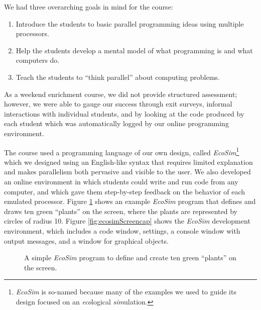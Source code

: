 \documentclass{sig-alternate}
\newcommand{\INDSTATE}[1][1]{\STATE\hspace{#1\algorithmicindent}}
\newcommand{\EcoSim}{\emph{EcoSim}}
\begin{document}
We had three overarching goals in mind for the course:
\begin{enumerate}
\item Introduce the students to basic parallel programming ideas using multiple processors.
\item Help the students develop a mental model of what programming is and what computers do.
\item Teach the students to ``think parallel'' about computing problems.
\end{enumerate}
As a weekend enrichment course, we did not provide structured assessment;
however, we were able to gauge our success through exit surveys, 
informal interactions with individual students, and by looking at the code produced by each student
which was automatically logged by our online programming environment.

The course used a programming language of our own design, called \EcoSim{}\footnote{
\EcoSim{} is so-named because many of the examples we used to guide its design 
focused on an \emph{eco}logical \emph{sim}ulation.} 
which we designed using an English-like syntax that requires limited explanation 
and makes parallelism both pervasive and visible to the user.
We also developed an online environment in which students could write and run code from any computer,
and which gave them step-by-step feedback on the behavior of each emulated processor.
Figure \ref{fig:exampleProgram} shows an example \emph{EcoSim} program that defines and
draws ten green ``plants'' on the screen, where the plants are represented by circles of radius 10.
Figure \ref{fig:ecosimScreencap} shows the \emph{EcoSim} development environment, which includes
a code window, settings, a console window with output messages, and a window for graphical objects.
\begin{figure}
\begin{algorithmic}[1]
  \INDSTATE{a position}
  \INDSTATE{size, a number}
  \INDSTATE{a color}
\STATE{}
  \INDSTATE{do in order}
  \INDSTATE{replace the plant's color with green}
  \INDSTATE{replace the plant's size with 10}
\end{algorithmic} 
\caption{A simple \emph{EcoSim} program to define and create ten green ``plants'' on the screen.}
\label{fig:exampleProgram} 
\end{figure}
\end{document}
